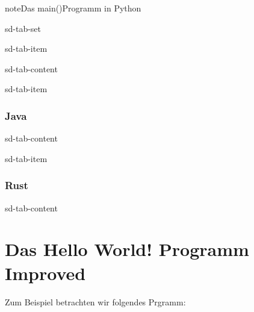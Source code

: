\documentclass[letterpaper,10pt,english]{jupyterBook}
\begin{document}
\begin{sphinxadmonition}{note}{Das main()\sphinxhyphen{}Programm in Python}
\begin{sphinxuseclass}{sd-tab-set}
\begin{sphinxuseclass}{sd-tab-item}
\begin{sphinxuseclass}{sd-tab-content}
\end{sphinxuseclass}
\end{sphinxuseclass}
\begin{sphinxuseclass}{sd-tab-item}\subsubsection*{Java}

\begin{sphinxuseclass}{sd-tab-content}
\begin{sphinxVerbatim}[commandchars=\\\{\}]
 
\PYG{o}{[}\PYG{o}{]}
\end{sphinxVerbatim}

\end{sphinxuseclass}
\end{sphinxuseclass}
\begin{sphinxuseclass}{sd-tab-item}\subsubsection*{Rust}

\begin{sphinxuseclass}{sd-tab-content}
\begin{sphinxVerbatim}[commandchars=\\\{\}]
 
\end{sphinxVerbatim}

\end{sphinxuseclass}
\end{sphinxuseclass}
\end{sphinxuseclass}\end{sphinxadmonition}


\section{Das Hello World! \sphinxhyphen{} Programm Improved}
\label{\detokenize{Notebooks/Hello World!:das-hello-world-programm-improved}}
\sphinxAtStartPar
Zum Beispiel betrachten wir folgendes Prgramm:
\end{document}
